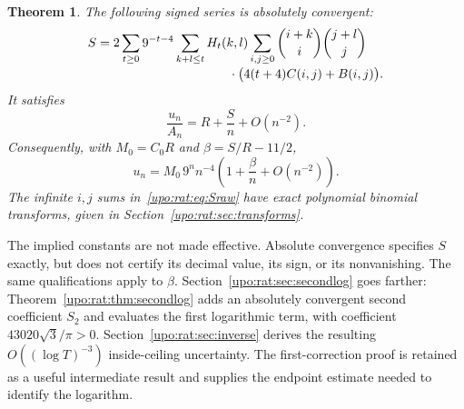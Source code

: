 \documentclass[11pt,letterpaper]{article}
\newtheorem{theorem}{Theorem}[section]
\theoremstyle{remark}\newtheorem{remark}[theorem]{Remark}
\numberwithin{equation}{section}
\begin{document}
\begin{theorem}\label{upo:rat:thm:correction}
The following signed series is absolutely convergent:
\begin{align}\label{upo:rat:eq:Sraw}
S={}&2\sum_{t\ge0}9^{-t-4}\sum_{k+l\le t}H_t(k,l)
\sum_{i,j\ge0}\binom{i+k}{i}\binom{j+l}{j}\\[-2pt]
&\hspace{32mm}\cdot\bigl(4(t+4)C(i,j)+B(i,j)\bigr).\notag
\end{align}
It satisfies
\begin{equation}\label{upo:rat:eq:ratioexp}
\frac{u_n}{A_n}=R+\frac Sn+O(n^{-2}).
\end{equation}
Consequently, with $M_0=C_0R$ and $\beta=S/R-11/2$,
\begin{equation}\label{upo:rat:eq:uexp}
u_n=M_0\,9^n n^{-4}\left(1+\frac\beta n+O(n^{-2})\right).
\end{equation}
The infinite $i,j$ sums in~\eqref{upo:rat:eq:Sraw} have exact polynomial
binomial transforms, given in Section~\ref{upo:rat:sec:transforms}.
\end{theorem}
The implied constants are not made effective. Absolute convergence
specifies $S$ exactly, but does not certify its decimal value, its sign,
or its nonvanishing. The same qualifications apply to $\beta$.
Section~\ref{upo:rat:sec:secondlog} goes farther: Theorem~\ref{upo:rat:thm:secondlog}
adds an absolutely convergent second coefficient $S_2$ and evaluates the
first logarithmic term, with coefficient $43020\sqrt3/\pi>0$.
Section~\ref{upo:rat:sec:inverse} derives the resulting $O((\log T)^{-3})$
inside-ceiling uncertainty. The first-correction proof is retained as a
useful intermediate result and supplies the endpoint estimate needed
to identify the logarithm.
\end{document}
